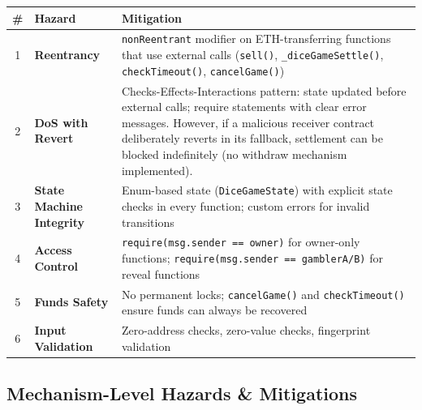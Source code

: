 \documentclass[10pt,a4paper]{article}
\begin{document}
\begin{table}[H]
\centering
\begin{tabularx}{\textwidth}{c X X}
\toprule
\textbf{\#} & \textbf{Hazard} & \textbf{Mitigation} \\
\midrule
1 & \textbf{Reentrancy} & \texttt{nonReentrant} modifier on ETH-transferring functions that use external calls (\texttt{sell()}, \texttt{\_diceGameSettle()}, \texttt{checkTimeout()}, \texttt{cancelGame()}) \\
2 & \textbf{DoS with Revert} & Checks-Effects-Interactions pattern: state updated before external calls; require statements with clear error messages. However, if a malicious receiver contract deliberately reverts in its fallback, settlement can be blocked indefinitely (no withdraw mechanism implemented). \\
3 & \textbf{State Machine Integrity} & Enum-based state (\texttt{DiceGameState}) with explicit state checks in every function; custom errors for invalid transitions \\
4 & \textbf{Access Control} & \texttt{require(msg.sender == owner)} for owner-only functions; \texttt{require(msg.sender == gamblerA/B)} for reveal functions \\
5 & \textbf{Funds Safety} & No permanent locks; \texttt{cancelGame()} and \texttt{checkTimeout()} ensure funds can always be recovered \\
6 & \textbf{Input Validation} & Zero-address checks, zero-value checks, fingerprint validation \\
\bottomrule
\end{tabularx}
\end{table}

\subsection*{Mechanism-Level Hazards \& Mitigations}
\end{document}
